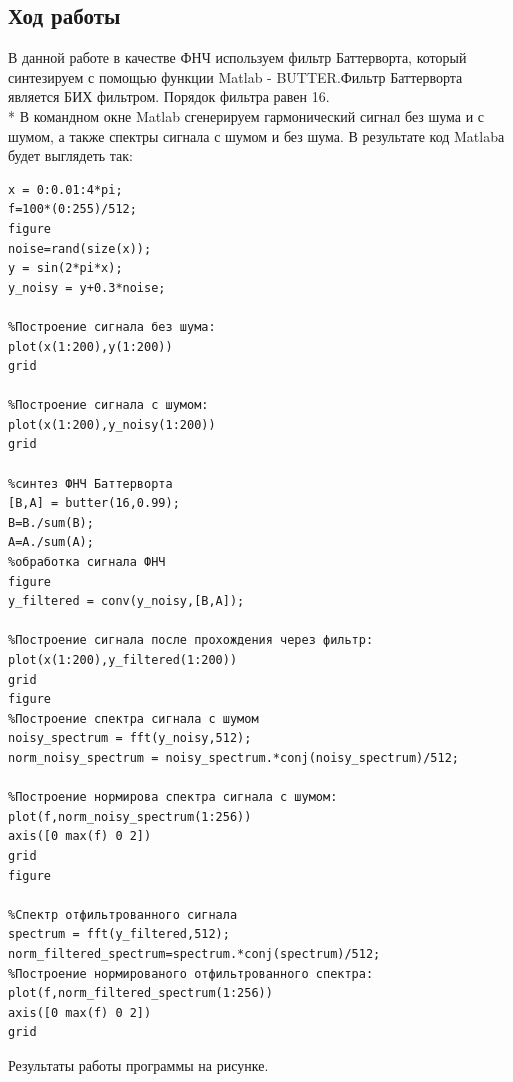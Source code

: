 \documentclass[10pt,a4paper]{article}
\begin{document}
\subsection{Ход работы}
В данной работе в качестве ФНЧ используем фильтр Баттерворта, который синтезируем с помощью функции Matlab - BUTTER.Фильтр Баттерворта является БИХ фильтром. Порядок фильтра равен 16.\\*
 В командном окне Matlab сгенерируем гармонический сигнал без шума и с шумом, а также спектры сигнала с шумом и без шума. В результате код Matlabа будет выглядеть так:
\begin{verbatim}
x = 0:0.01:4*pi;
f=100*(0:255)/512;
figure
noise=rand(size(x));
y = sin(2*pi*x);
y_noisy = y+0.3*noise;

%Построение сигнала без шума:
plot(x(1:200),y(1:200))
grid

%Построение сигнала с шумом:
plot(x(1:200),y_noisy(1:200))
grid

%синтез ФНЧ Баттерворта
[B,A] = butter(16,0.99);
B=B./sum(B);
A=A./sum(A);
%обработка сигнала ФНЧ
figure
y_filtered = conv(y_noisy,[B,A]);

%Построение сигнала после прохождения через фильтр:
plot(x(1:200),y_filtered(1:200))
grid
figure
%Построение спектра сигнала с шумом
noisy_spectrum = fft(y_noisy,512);
norm_noisy_spectrum = noisy_spectrum.*conj(noisy_spectrum)/512;

%Построение нормирова спектра сигнала с шумом:
plot(f,norm_noisy_spectrum(1:256))
axis([0 max(f) 0 2])
grid
figure

%Спектр отфильтрованного сигнала
spectrum = fft(y_filtered,512);
norm_filtered_spectrum=spectrum.*conj(spectrum)/512;
%Построение нормированого отфильтрованного спектра:
plot(f,norm_filtered_spectrum(1:256))
axis([0 max(f) 0 2])
grid
\end{verbatim}
Результаты работы программы на рисунке.
\end{document}
